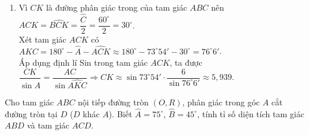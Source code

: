 \begin{bt}
{\begin{enumerate}
			$$
			\cos \widehat{A} =\dfrac{AB^2 + AC^2 - BC^2}{2AC\cdot AB}
			=\dfrac{(2\sqrt{13})^2+6^2-8^2}{2\cdot 2\sqrt{13}\cdot 6}=\dfrac{\sqrt{13}}{13}\\
			\Rightarrow \widehat{A} \approx 73^\circ 54'.
			$$
			Xét tam giác $ABC$, ta có\\
			$$\widehat{B}=180^\circ - \widehat{A} - \widehat{C} \approx 180^\circ - 73^\circ 54' - 60^\circ = 46^\circ 6'.$$
			\item %
			Vì $CK$ là đường phân giác trong của tam giác $ABC$ nên $\widehat{ACK}=\widehat{BCK}=\dfrac{\widehat{C}}{2}=\dfrac{60^\circ}{2}=30^\circ$.\\
			Xét tam giác $ACK$ có\\
			$\widehat{AKC}=180^\circ - \widehat{A}-\widehat{ACK} \approx 180^\circ - 73^\circ 54'-30^\circ=76^\circ 6'$.\\
			Áp dụng định lí Sin trong tam giác $ACK$, ta được\\
			$\dfrac{CK}{\sin \widehat{A}}=\dfrac{AC}{\sin \widehat{AKC}} \Rightarrow CK \approx \sin 73^\circ 54'\cdot \dfrac{6}{\sin 76^\circ 6'} \approx 5,939$.
		\end{enumerate}
	}
\end{bt}

\begin{bt}%
	Cho tam giác $ ABC $ nội tiếp đường tròn $ (O,R) $, phân giác trong góc $ A $ cắt đường tròn tại $ D $ ($ D $ khác $ A $). Biết $ \widehat{A}=75^\circ $, $ \widehat{B}=45^\circ $, tính tỉ số diện tích tam giác $ ABD $ và tam giác $ ACD $.
\end{bt}

